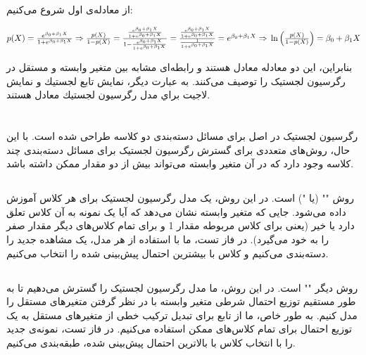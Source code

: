 \documentclass{article}
\begin{document}
\section{}%
از معادله‌ی اول شروع می‌کنیم:
\begin{latin}
$
p(X) = \frac{e ^ {\beta_0 + \beta_1 X}}{1 + e ^ {\beta_0 + \beta_1 X}} \Rightarrow \\
\frac{p(X)}{1 - p(X)} = \frac{\frac{e ^ {\beta_0 + \beta_1 X}}{1 + e ^ {\beta_0 + \beta_1 X}}}{1 - \frac{e ^ {\beta_0 + \beta_1 X}}{1 + e ^ {\beta_0 + \beta_1 X}}} =  \frac{\frac{e ^ {\beta_0 + \beta_1 X}}{1 + e ^ {\beta_0 + \beta_1 X}}}{\frac{1}{1 + e ^ {\beta_0 + \beta_1 X}}} = e ^ {\beta_0 + \beta_1 X} \Rightarrow \\
\ln\left( \frac{p(X)}{1 - p(X)} \right) = \beta_0 + \beta_1 X
$
\end{latin}
بنابراین، این دو معادله معادل هستند و رابطه‌ای مشابه بین متغیر وابسته و مستقل در رگرسیون لجستیک را توصیف می‌کنند. به عبارت ديگر، نمايش تابع لجستيك و نمايش لاجيت براي مدل رگرسيون لجستيك معادل هستند.


\section{}%
رگرسیون لجستیک در اصل برای مسائل دسته‌بندی دو کلاسه طراحی شده است. با این حال، روش‌های متعددی برای گسترش رگرسیون لجستیک برای مسائل دسته‌بندی چند کلاسه وجود دارد که در آن متغیر وابسته می‌تواند بیش از دو مقدار ممکن داشته باشد.
\subsection{}
روش "" (یا ") است. در این روش، یک مدل رگرسیون لجستیک برای هر کلاس آموزش داده می‌شود. جایی که متغیر وابسته نشان می‌دهد که آیا یک نمونه به آن کلاس تعلق دارد یا خیر (یعنی برای کلاس مربوطه مقدار 1 و برای تمام کلاس‌های دیگر مقدار صفر را به خود می‌گیرد). در فاز تست، ما با استفاده از هر مدل، یک مشاهده جدید را دسته‌بندی می‌کنیم و کلاس با بیشترین احتمال پیش‌بینی شده را انتخاب می‌کنیم.
\subsection{}
روش دیگر "" است. در این روش، ما مدل رگرسیون لجستیک را گسترش می‌دهیم تا به طور مستقیم توزیع احتمال شرطی متغیر وابسته با در نظر گرفتن متغیرهای مستقل را مدل کنیم. به طور خاص، ما از تابع  برای تبدیل ترکیب خطی از متغیرهای مستقل به یک توزیع احتمال برای تمام کلاس‌های ممکن استفاده می‌کنیم. در فاز تست، نمونه‌ی جدید را با انتخاب کلاس با بالاترین احتمال پیش‌بینی شده، طبقه‌بندی می‌کنیم.
\end{document}
